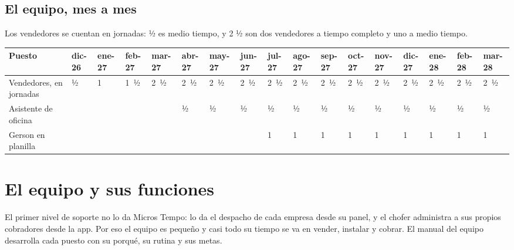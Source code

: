 \documentclass[10.5pt,a4paper]{article}
\begin{document}
\begin{landscape}
\subsection{El equipo, mes a mes}
Los vendedores se cuentan en jornadas: ½ es medio tiempo, y 2 ½ son dos vendedores a tiempo completo y uno a medio tiempo.

{\scriptsize\setlength{\tabcolsep}{3pt}
\begin{tabular}{@{}l*{16}{Q}@{}}
\toprule
Puesto & dic-26 & ene-27 & feb-27 & mar-27 & abr-27 & may-27 & jun-27 & jul-27 & ago-27 & sep-27 & oct-27 & nov-27 & dic-27 & ene-28 & feb-28 & mar-28 \\
\midrule
Vendedores, en jornadas & ½ & 1 & 1~½ & 2~½ & 2~½ & 2~½ & 2~½ & 2~½ & 2~½ & 2~½ & 2~½ & 2~½ & 2~½ & 2~½ & 2~½ & 2~½ \\
Asistente de oficina &  &  &  &  & ½ & ½ & ½ & ½ & ½ & ½ & ½ & ½ & ½ & ½ & ½ & ½ \\
Gerson en planilla &  &  &  &  &  &  &  & 1 & 1 & 1 & 1 & 1 & 1 & 1 & 1 & 1 \\
\bottomrule
\end{tabular}}
\end{landscape}

\section{El equipo y sus funciones}

El primer nivel de soporte no lo da Micros Tempo: lo da el despacho de cada empresa desde su panel, y el chofer administra a sus propios cobradores desde la app. Por eso el equipo es pequeño y casi todo su tiempo se va en vender, instalar y cobrar. El manual del equipo desarrolla cada puesto con su porqué, su rutina y sus metas.
\end{document}
